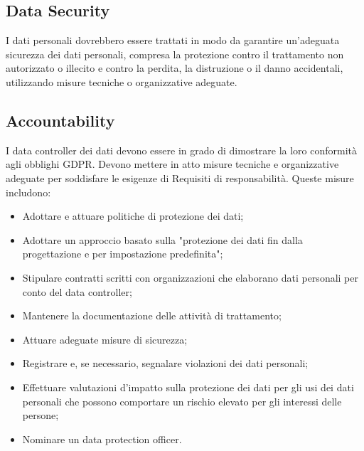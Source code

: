 \subsection{Data Security}
I dati personali dovrebbero essere trattati in modo da garantire un'adeguata sicurezza dei dati personali, compresa la protezione contro il trattamento non autorizzato o illecito e contro la perdita, la distruzione o il danno accidentali, utilizzando misure tecniche o organizzative adeguate.

\subsection{Accountability}
I data controller dei dati devono essere in grado di dimostrare la loro conformità agli obblighi GDPR. Devono mettere in atto misure tecniche e organizzative adeguate per soddisfare le esigenze di Requisiti di responsabilità. Queste misure includono:
\begin{itemize}
    \item Adottare e attuare politiche di protezione dei dati;
    \item Adottare un approccio basato sulla "protezione dei dati fin dalla progettazione e per impostazione predefinita";
    \item Stipulare contratti scritti con organizzazioni che elaborano dati personali per conto del data controller;
    \item Mantenere la documentazione delle attività di trattamento;
    \item Attuare adeguate misure di sicurezza;
    \item Registrare e, se necessario, segnalare violazioni dei dati personali;
    \item Effettuare valutazioni d'impatto sulla protezione dei dati per gli usi dei dati personali che possono comportare un rischio elevato per gli interessi delle persone;
    \item Nominare un data protection officer.
\end{itemize}

